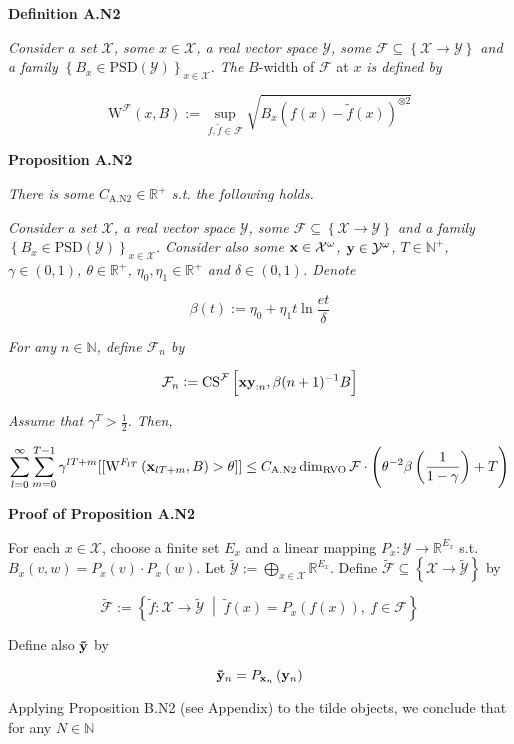 \documentclass[a4paper]{article}
\newcommand{\Co}[1]{}
\newcommand{\AP}[1]{\left(#1\right)}
\newcommand{\AB}[1]{\left[#1\right]}
\newcommand{\AC}[1]{\left\{#1\right\}}
\newcommand{\ACM}[2]{\left\{#1\;\middle\vert\;#2\right\}}
\newcommand{\Nats}{\mathbb{N}}
\newcommand{\Reals}{\mathbb{R}}
\newcommand{\PSD}{\mathrm{PSD}}
\newcommand{\B}{B}
\newcommand{\X}{\mathcal{X}}
\newcommand{\Y}{\mathcal{Y}}
\newcommand{\F}{\mathcal{F}}
\DeclareMathOperator{\RVO}{\dim_{RVO}}
\newcommand{\CS}{\mathrm{CS}}
\newcommand{\W}{\mathrm{W}}
\begin{document}
\Co{b}

\textbf{Definition A.N2}\Co{b}

\textit{Consider a set $\X$, some $x\in\X$, a real vector space $\Y$, some $\F\subseteq\AC{\X\rightarrow\Y}$ and a family $\AC{\B _x\in\PSD(\Y)}_{x\in\X}$. The}\Co{i} $\B $-width of $\F$ at $x$ \textit{is defined by}\Co{i}

$$\W^\F(x,B):=\sup_{f,\tilde{f}\in\F}\sqrt{\B _x\AP{f(x)-\tilde{f}(x)}^{\otimes2}}$$  

\textbf{Proposition A.N2}\Co{b}

\textit{There is some $C_{\mathrm{A.N2}}\in\Reals^+$ s.t. the following holds.}\Co{i}

\textit{Consider a set $\X$, a real vector space $\Y$, some $\F\subseteq\AC{\X\rightarrow\Y}$ and a family $\AC{\B _x\in\PSD(\Y)}_{x\in\X}$. Consider also some $\bold{x}\in\X^\omega$, $\bold{y}\in\Y^\omega$, $T\in\Nats^+$, $\gamma\in(0,1)$, $\theta\in\Reals^+$, $\eta_0,\eta_1\in\Reals^+$ and $\delta\in(0,1)$. Denote}\Co{i}

$$\beta(t):=\eta_0 + \eta_1t\ln{\frac{et}{\delta}}$$

\textit{For any $n\in\Nats$, define $\F_n$ by}\Co{i}

$$\F_n:=\CS^\F\AB{\bold{xy}_{:n},\beta(n+1)^{-1}\B}$$

\textit{Assume that $\gamma^T>\frac{1}{2}$. Then,}\Co{i}

$$\sum_{l=0}^\infty\sum_{m=0}^{T-1}{\gamma^{lT+m}[[\W^{F_{lT}}\AP{\bold{x}_{lT+m},B}>\theta]]} \leq C_{\mathrm{A.N2}}\RVO{\F}\cdot\AP{\theta^{-2}\beta\AP{\frac{1}{1-\gamma}}+T}$$

\textbf{Proof of Proposition A.N2}\Co{b}

 
For each $x\in\X$, choose a finite set $E_x$ and a linear mapping $P_x:\Y\rightarrow\Reals^{E_x}$ s.t. $B_x\AP{v,w}=P_x(v)\cdot P_x(w)$. Let $\tilde{\Y}:=\bigoplus_{x\in\X}\Reals^{E_x}$. Define $\tilde{\F}\subseteq\AC{\X\rightarrow\tilde{\Y}}$ by

$$\tilde{\F}:=\ACM{\tilde{f}:\X\rightarrow\tilde{\Y}}{\tilde{f}(x)=P_x\AP{f(x)},\ f\in\F}$$

Define also $\bold{\tilde{y}}$ by

$$\bold{\tilde{y}}_n=P_{\bold{x}_n}\AP{\bold{y}_n}$$

Applying Proposition B.N2 (see Appendix) to the tilde objects, we conclude that for any $N\in\Nats$
\end{document}
